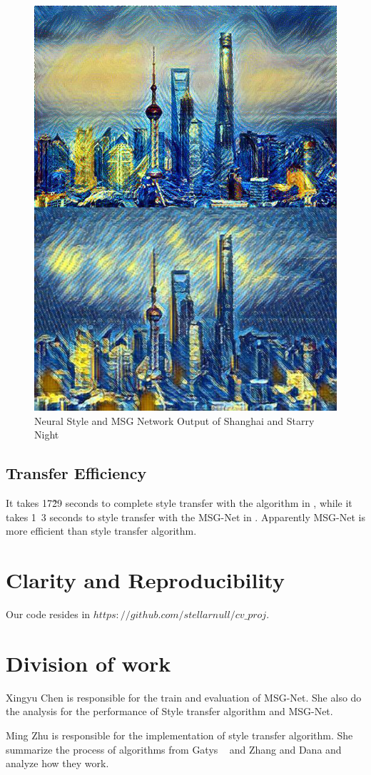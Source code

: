 \documentclass[10pt,twocolumn,letterpaper]{article}
\begin{document}
\begin{figure}[t]
\begin{center}
\includegraphics[width=0.6\linewidth]{images/shn_cmp.jpg}
\end{center}
\caption{Neural Style and MSG Network Output of Shanghai and Starry Night}
\label{fig:long}
\label{fig:onecol}
\label{fig_shn_cmp}
\end{figure}

\subsection{Transfer Efficiency}
It takes 17\~29 seconds to complete style transfer with the algorithm in \cite{Authors01}, while it takes 1~3 seconds to style transfer with the MSG-Net in \cite{Authors04}. Apparently MSG-Net is more efficient than style transfer algorithm. 



\section{Clarity and Reproducibility}
Our code resides in \newline $https://github.com/stellarnull/cv\_proj$.


\section{Division of work}
Xingyu Chen is responsible for the train and evaluation of MSG-Net. She also do the analysis for the performance of Style transfer algorithm and MSG-Net.

Ming Zhu is responsible for the implementation of style transfer algorithm. She summarize the process of algorithms from Gatys \etal~\cite{Authors01} and Zhang and Dana \cite{Authors04} and analyze how they work.

{\small


}
\end{document}
